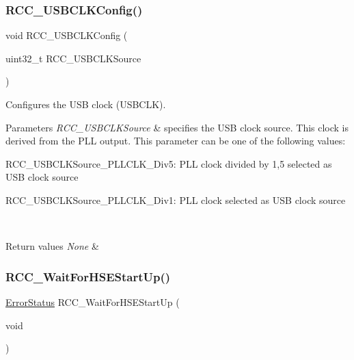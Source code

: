 \subsubsection{\texorpdfstring{RCC\_USBCLKConfig()}{RCC\_USBCLKConfig()}}
{\footnotesize\ttfamily void R\+C\+C\+\_\+\+U\+S\+B\+C\+L\+K\+Config (\begin{DoxyParamCaption}\item[{uint32\+\_\+t}]{R\+C\+C\+\_\+\+U\+S\+B\+C\+L\+K\+Source }\end{DoxyParamCaption})}



Configures the U\+SB clock (U\+S\+B\+C\+LK). 


\begin{DoxyParams}{Parameters}
{\em R\+C\+C\+\_\+\+U\+S\+B\+C\+L\+K\+Source} & specifies the U\+SB clock source. This clock is derived from the P\+LL output. This parameter can be one of the following values\+: \begin{DoxyItemize}
\item R\+C\+C\+\_\+\+U\+S\+B\+C\+L\+K\+Source\+\_\+\+P\+L\+L\+C\+L\+K\+\_\+Div5\+: P\+LL clock divided by 1,5 selected as U\+SB clock source \item R\+C\+C\+\_\+\+U\+S\+B\+C\+L\+K\+Source\+\_\+\+P\+L\+L\+C\+L\+K\+\_\+\+Div1\+: P\+LL clock selected as U\+SB clock source \end{DoxyItemize}
\\
\hline
\end{DoxyParams}

\begin{DoxyRetVals}{Return values}
{\em None} & \\
\hline
\end{DoxyRetVals}
\mbox{\label{group___r_c_c___exported___functions_gae0f15692614dd048ee4110a056f001dc}} 
\subsubsection{\texorpdfstring{RCC\_WaitForHSEStartUp()}{RCC\_WaitForHSEStartUp()}}
{\footnotesize\ttfamily \mbox{\hyperlink{group___exported__types_ga8333b96c67f83cba354b3407fcbb6ee8}{Error\+Status}} R\+C\+C\+\_\+\+Wait\+For\+H\+S\+E\+Start\+Up (\begin{DoxyParamCaption}\item[{void}]{ }\end{DoxyParamCaption})}



